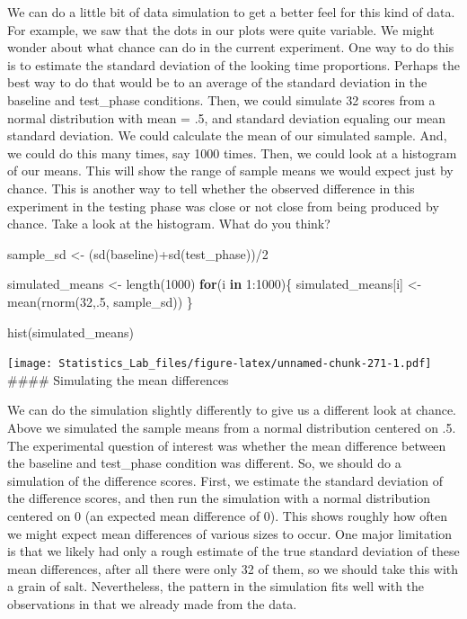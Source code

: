 \documentclass[
]{book}
\newenvironment{Shaded}{\begin{snugshade}}{\end{snugshade}}
\newcommand{\ControlFlowTok}[1]{\textcolor[rgb]{0.13,0.29,0.53}{\textbf{#1}}}
\newcommand{\DecValTok}[1]{\textcolor[rgb]{0.00,0.00,0.81}{#1}}
\newcommand{\FunctionTok}[1]{\textcolor[rgb]{0.00,0.00,0.00}{#1}}
\newcommand{\NormalTok}[1]{#1}
\newcommand{\OtherTok}[1]{\textcolor[rgb]{0.56,0.35,0.01}{#1}}
\newcommand{\SpecialCharTok}[1]{\textcolor[rgb]{0.00,0.00,0.00}{#1}}
\begin{document}
We can do a little bit of data simulation to get a better feel for this kind of data. For example, we saw that the dots in our plots were quite variable. We might wonder about what chance can do in the current experiment. One way to do this is to estimate the standard deviation of the looking time proportions. Perhaps the best way to do that would be to an average of the standard deviation in the baseline and test\_phase conditions. Then, we could simulate 32 scores from a normal distribution with mean = .5, and standard deviation equaling our mean standard deviation. We could calculate the mean of our simulated sample. And, we could do this many times, say 1000 times. Then, we could look at a histogram of our means. This will show the range of sample means we would expect just by chance. This is another way to tell whether the observed difference in this experiment in the testing phase was close or not close from being produced by chance. Take a look at the histogram. What do you think?

\begin{Shaded}
\begin{Highlighting}[]
\NormalTok{sample\_sd   }\OtherTok{\textless{}{-}}\NormalTok{ (}\FunctionTok{sd}\NormalTok{(baseline)}\SpecialCharTok{+}\FunctionTok{sd}\NormalTok{(test\_phase))}\SpecialCharTok{/}\DecValTok{2}

\NormalTok{simulated\_means }\OtherTok{\textless{}{-}} \FunctionTok{length}\NormalTok{(}\DecValTok{1000}\NormalTok{)}
\ControlFlowTok{for}\NormalTok{(i }\ControlFlowTok{in} \DecValTok{1}\SpecialCharTok{:}\DecValTok{1000}\NormalTok{)\{}
\NormalTok{ simulated\_means[i] }\OtherTok{\textless{}{-}} \FunctionTok{mean}\NormalTok{(}\FunctionTok{rnorm}\NormalTok{(}\DecValTok{32}\NormalTok{,.}\DecValTok{5}\NormalTok{, sample\_sd))}
\NormalTok{\}}

\FunctionTok{hist}\NormalTok{(simulated\_means)}
\end{Highlighting}
\end{Shaded}

\texttt{[image: Statistics\_Lab\_files/figure-latex/unnamed-chunk-271-1.pdf]}
\#\#\#\# Simulating the mean differences

We can do the simulation slightly differently to give us a different look at chance. Above we simulated the sample means from a normal distribution centered on .5. The experimental question of interest was whether the mean difference between the baseline and test\_phase condition was different. So, we should do a simulation of the difference scores. First, we estimate the standard deviation of the difference scores, and then run the simulation with a normal distribution centered on 0 (an expected mean difference of 0). This shows roughly how often we might expect mean differences of various sizes to occur. One major limitation is that we likely had only a rough estimate of the true standard deviation of these mean differences, after all there were only 32 of them, so we should take this with a grain of salt. Nevertheless, the pattern in the simulation fits well with the observations in that we already made from the data.
\end{document}

